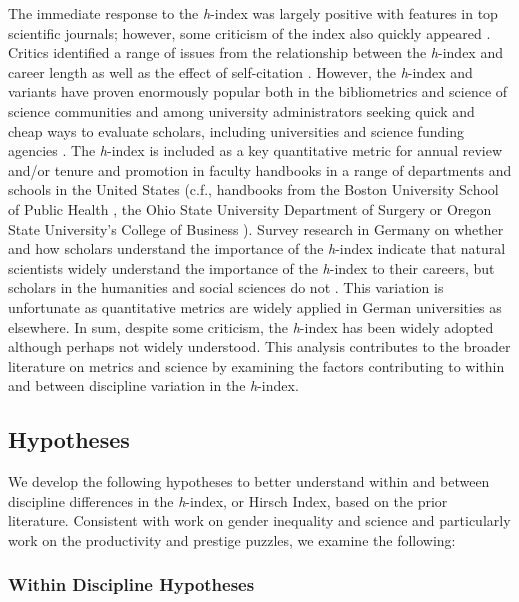 \documentclass[
  10pt,
  letterpaper,
]{article}
\begin{document}
The immediate response to the \emph{h}-index was largely positive with
features in top scientific journals; however, some criticism of the
index also quickly appeared \citep{barnes_hindex_2017}. Critics
identified a range of issues from the relationship between the
\emph{h}-index and career length as well as the effect of self-citation
\citep[ among others]{kelly_index_2006, purvis_index_2006}. However, the
\emph{h}-index and variants have proven enormously popular both in the
bibliometrics and science of science communities and among university
administrators seeking quick and cheap ways to evaluate scholars,
including universities and science funding agencies
\citep{barnes_hindex_2017}. The \emph{h}-index is included as a key
quantitative metric for annual review and/or tenure and promotion in
faculty handbooks in a range of departments and schools in the United
States (c.f., handbooks from the Boston University School of Public
Health \citep{bostonuniversity_boston_2018}, the Ohio State University
Department of Surgery \citep{ohiostateuniversity_department_2014} or
Oregon State University's College of Business
\citep{oregonstateuniversity_oregon_2020}). Survey research in Germany
on whether and how scholars understand the importance of the
\emph{h}-index indicate that natural scientists widely understand the
importance of the \emph{h}-index to their careers, but scholars in the
humanities and social sciences do not \citep{kamrani_researchers_2021}.
This variation is unfortunate as quantitative metrics are widely applied
in German universities as elsewhere. In sum, despite some criticism, the
\emph{h}-index has been widely adopted although perhaps not widely
understood. This analysis contributes to the broader literature on
metrics and science by examining the factors contributing to within and
between discipline variation in the \emph{h}-index.

\subsection{Hypotheses}\label{hypotheses}

We develop the following hypotheses to better understand within and
between discipline differences in the \emph{h}-index, or Hirsch Index,
based on the prior literature. Consistent with work on gender inequality
and science and particularly work on the productivity and prestige
puzzles, we examine the following:

\subsubsection{Within Discipline
Hypotheses}\label{within-discipline-hypotheses}
\end{document}
